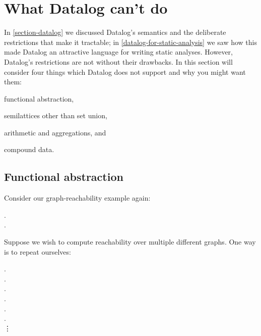 
\section{What Datalog can't do}

In \cref{section-datalog} we discussed Datalog's semantics and the deliberate
restrictions that make it tractable; in \cref{datalog-for-static-analysis} we saw how this made Datalog an attractive language for writing static analyses. However, Datalog's restrictions are not without their drawbacks. In this section will consider four things which Datalog does not support and why you might want them:
\begin{enumerate*}[label=({\arabic*})]
  \item functional abstraction,
  \item semilattices other than set union,
  \item arithmetic and aggregations, and
  \item compound data.
\end{enumerate*}


\subsection{Functional abstraction}

Consider our graph-reachability example again:

\begin{datalog}
  .\\
   \gets {} \conj {}.
\end{datalog}

\noindent
Suppose we wish to compute reachability over multiple different graphs. One way is to repeat ourselves:

\nopagebreak[2]
\begin{datalog}
  .\\
   \gets {} \conj {}.
  \\[1ex]
  .\\
   \gets {} \conj {}.
  \\[1ex]
  .\\
   \gets {} \conj {}.
  \\
  \qquad\vdots
\end{datalog}

